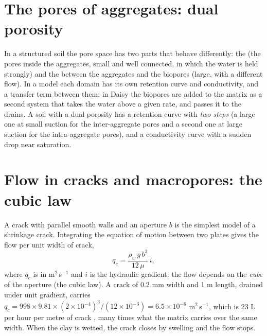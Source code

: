 \section{The pores of aggregates: dual porosity}
In a structured soil the pore space has two parts that behave differently: the  (the pores inside the aggregates, small and well connected, in which the water is held strongly) and the  between the aggregates and the biopores (large, with a different flow). In a  model each domain has its own retention curve and conductivity, and a transfer term between them; in Daisy the biopores are added to the matrix as a second system that takes the water above a given rate, and passes it to the drains. A soil with a dual porosity has a retention curve with \emph{two steps} (a large one at small suction for the inter-aggregate pores and a second one at large suction for the intra-aggregate pores), and a conductivity curve with a sudden drop near saturation.

\section{Flow in cracks and macropores: the cubic law}
A crack with parallel smooth walls and an aperture $b$ is the simplest model of a shrinkage crack. Integrating the equation of motion between two plates gives the flow per unit width of crack,
\begin{equation}\label{eq:pg-crack}\boxed{q_c=\frac{\rho_w\,g\,b^{3}}{12\,\mu}\,i,}\end{equation}
where $q_c$ is in m$^2$\,s$^{-1}$ and $i$ is the hydraulic gradient: the flow depends on the \emph{cube} of the aperture (the cubic law). A crack of 0.2 mm width and 1 m length, drained under unit gradient, carries $q_c=998\times9.81\times(2\times10^{-4})^3/(12\times10^{-3})=6.5\times10^{-6}$ m$^2$\,s$^{-1}$, which is 23 L per hour per metre of crack \finans, many times what the matrix carries over the same width. When the clay is wetted, the crack closes by swelling and the flow stops.

